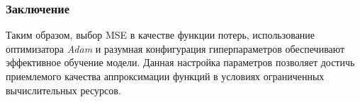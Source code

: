 \subsubsection{Заключение}

Таким образом, выбор MSE в качестве функции потерь, использование оптимизатора \textit{Adam} и разумная конфигурация гиперпараметров обеспечивают эффективное обучение модели. Данная настройка параметров позволяет достичь приемлемого качества аппроксимации функций в условиях ограниченных вычислительных ресурсов.

